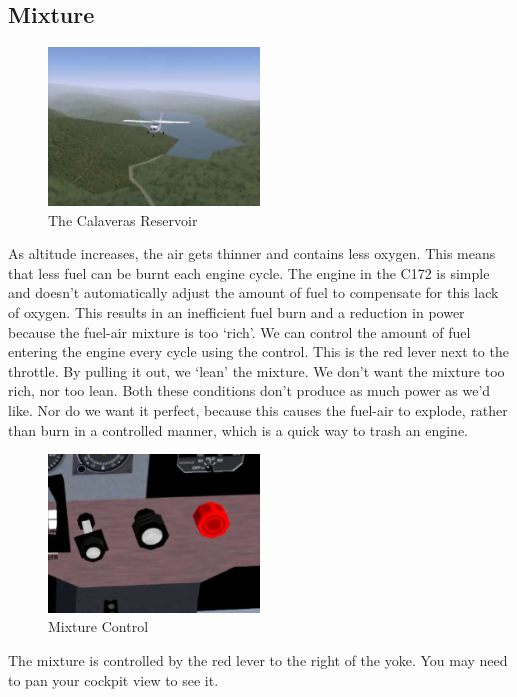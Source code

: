 \subsection{Mixture}

\begin{figure}[!htp]
\centering
\includegraphics[width=0.5\textwidth]{calaveras2}
\caption{The Calaveras Reservoir}
\end{figure}

As altitude increases, the air gets thinner and contains less oxygen.
This means that less fuel can be burnt each engine cycle.
The engine in the C172 is simple and doesn't automatically
adjust the amount of fuel to compensate for this lack of oxygen.
This results in an inefficient fuel burn and a reduction in power
because the fuel-air mixture is too `rich'. We can control the
amount of fuel entering the engine every cycle using the  control.
This is the red lever next to the throttle. By pulling it out, we `lean'
the mixture. We don't want the mixture too rich, nor too lean.
Both these conditions don't produce as much power as we'd like.
Nor do we want it perfect, because this causes the fuel-air to explode,
rather than burn in a controlled manner, which is a quick way to trash an engine.

\begin{figure}[!htp]
\centering
\includegraphics[width=0.5\textwidth]{mixture}
\caption{Mixture Control\label{mixture}}
\end{figure}

The mixture is controlled by the red lever to the right of the yoke.
You may need to pan your cockpit view to see it.

